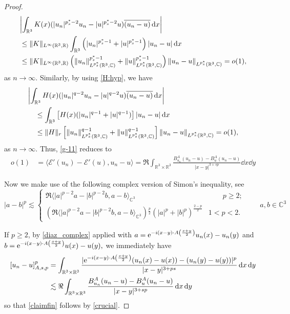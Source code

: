 \documentclass[leqno,11pt]{amsart}
\newcommand{\R}{\mathbb R}
\newcommand{\C}{\mathbb C}
\newcommand{\cE}{{\mathcal E}}
\numberwithin{equation}{section}
\def\e{{\rm e}}
\newcommand{\expAminus}{\e^{-i(x-y)\cdot A\left(\frac{x+y}{2}\right)}}
\begin{document}
\begin{proof}
$$
\begin{aligned}
    &\lefteqn{\left|\int_{\R^3}K(x)(|u_n|^{p^*_s-2}u_n-|u|^{p^*_s-2}u)\overline{(u_n-u)}\dd x\right|}\\
    &\le \|K\|_{L^\infty(\R^3,\R)} \int_{\R^3} \left(|u_n|^{p^*_s-1}+|u|^{p^*_s-1}\right)|u_n-u|\dd x\\
    & \le \|K\|_{L^\infty(\R^3,\R)} \left(\|u_n\|_{L^{p^*_s}(\R^3,\C)}^{p^*_s-1}+\|u\|_{L^{p^*_s}(\R^3,\C)}^{p^*_s-1}\right)\|u_n-u\|_{L^{p^*_s}(\R^3,\C)}=o(1),
\end{aligned}
$$
as $n\to\infty$. Similarly, by using \eqref{H:hyp}, we have
$$
    \begin{aligned}
    &\lefteqn{\left|\int_{\R^3}H(x)(|u_n|^{q-2}u_n-|u|^{q-2}u)\overline{(u_n-u)}\dd x\right|}\\
    &\quad \le\int_{\R^3} \left[H(x)(|u_n|^{q-1}+|u|^{q-1})\right]|u_n-u|\dd x\\
    & \quad \le\|H\|_{r}\left[\|u_n\|_{L^{p^*_s}(\R^3,\C)}^{q-1}+\|u\|_{L^{p^*_s}(\R^3,\C)}^{q-1}\right ]\|u_n-u\|_{L^{p^*_s}(\R^3,\C)}=o(1),
    \end{aligned}
$$
as $n\to\infty$. Thus, \eqref{g-11} reduces to 
\begin{equation}\label{crucial}
\begin{aligned}
    o(1)&=\langle \cE'(u_n)-\cE'(u),u_n-u\rangle=\Re \int_{\R^3\times \R^3}\frac{B^A_{u_n}(u_n-u)-B^A_{u}(u_n-u)}{|x-y|^{3+sp}}\dd x \dd y
\end{aligned}
\end{equation}


Now we make use of the following complex version of Simon's inequality, see \cite[Appendix]{bfk}
\begin{equation}\label{diaz_complex}
    |a\!-\!b|^{p}\!\lesssim\!\!\begin{cases}\Re\langle |a|^{p-2}a- |b|^{p-2}b
    ,a-b\rangle_{\mathbb C^3}&\phantom{1<\,}p\!\geq \!2;\\
    \!\left(\!\Re\langle |a|^{p-2}a- |b|^{p-2}b
    ,a-b\rangle_{\mathbb C^3}\!\right)\!^{\frac{p}{2}}\!\left(|a|^p+|b|^p\right)^{\frac{2-p}{2}} 
    &1\!<\!p\!<\!2.\end{cases}\qquad a,b\in\mathbb C^3
\end{equation}

If $p\ge 2$, by \eqref{diaz_complex} applied with $a=\expAminus u_n(x) - u_n(y)$ and $b=\expAminus u(x) - u(y),$
we immediately have
$$
\begin{aligned}
    [u_n-u]_{A,s,p}^p& =\int_{\R^3\times \R^3}\frac{|\expAminus (u_n(x)-u(x)) - (u_n(y)-u(y))|^p}{|x-y|^{3+ps}} \dd x \dd y\\
    &\lesssim  \Re \int_{\R^3\times \R^3}\frac{B^A_{u_n}(u_n-u)-B^A_{u}(u_n-u)}{|x-y|^{3+sp}}\dd x \dd y
\end{aligned}
$$
so that \eqref{claimfin} follows by \eqref{crucial}.


\end{proof}
\end{document}
